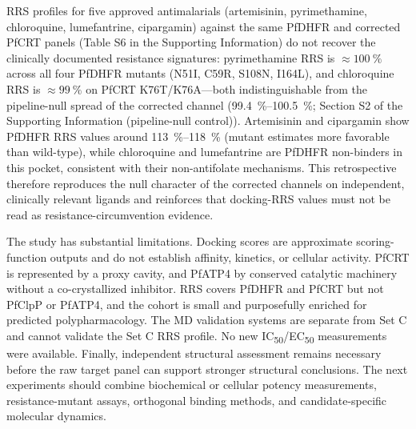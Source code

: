\documentclass[11pt,a4paper]{article}
\begin{document}
	RRS profiles for five approved antimalarials (artemisinin, pyrimethamine, chloroquine, lumefantrine, cipargamin) against the same PfDHFR and corrected PfCRT panels (Table S6 in the Supporting Information) do not recover the clinically documented resistance signatures: pyrimethamine RRS is $\approx\qty{100}{\percent}$ across all four PfDHFR mutants (N51I, C59R, S108N, I164L), and chloroquine RRS is $\approx\qty{99}{\percent}$ on PfCRT K76T/K76A---both indistinguishable from the pipeline-null spread of the corrected channel (\qtyrange{99.4}{100.5}{\percent}; Section S2 of the Supporting Information (pipeline-null control)). Artemisinin and cipargamin show PfDHFR RRS values around \qtyrange{113}{118}{\percent} (mutant estimates more favorable than wild-type), while chloroquine and lumefantrine are PfDHFR non-binders in this pocket, consistent with their non-antifolate mechanisms. This retrospective therefore reproduces the null character of the corrected channels on independent, clinically relevant ligands and reinforces that docking-RRS values must not be read as resistance-circumvention evidence.
	
	The study has substantial limitations. Docking scores are approximate scoring-function outputs and do not establish affinity, kinetics, or cellular activity. PfCRT is represented by a proxy cavity, and PfATP4 by conserved catalytic machinery without a co-crystallized inhibitor. RRS covers PfDHFR and PfCRT but not PfClpP or PfATP4, and the cohort is small and purposefully enriched for predicted polypharmacology. The MD validation systems are separate from Set C and cannot validate the Set C RRS profile. No new IC\textsubscript{50}/EC\textsubscript{50} measurements were available. Finally, independent structural assessment remains necessary before the raw target panel can support stronger structural conclusions. The next experiments should combine biochemical or cellular potency measurements, resistance-mutant assays, orthogonal binding methods, and candidate-specific molecular dynamics.
	
\end{document}
